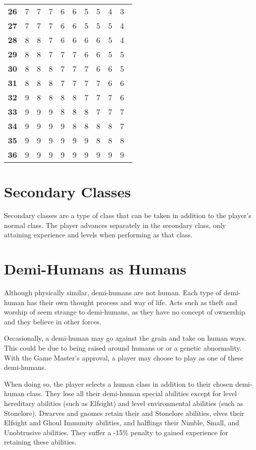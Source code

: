 \begin{multicols*}{2}
\begin {table}[H]
\begin{tabularx}{\columnwidth}{>{\bfseries}YYYYYYYYYY}
		26 & 7 & 7 & 7 & 6 & 6 & 5 & 5 & 4 & 3\\
		27 & 7 & 7 & 7 & 6 & 6 & 5 & 5 & 5 & 4\\
		28 & 8 & 8 & 7 & 6 & 6 & 6 & 6 & 5 & 4\\
		29 & 8 & 8 & 7 & 7 & 7 & 6 & 6 & 5 & 5\\
		30 & 8 & 8 & 8 & 7 & 7 & 7 & 6 & 6 & 5\\
		31 & 8 & 8 & 8 & 7 & 7 & 7 & 7 & 6 & 6\\
		32 & 9 & 8 & 8 & 8 & 8 & 7 & 7 & 7 & 6\\
		33 & 9 & 9 & 9 & 8 & 8 & 8 & 7 & 7 & 7\\
		34 & 9 & 9 & 9 & 9 & 8 & 8 & 8 & 8 & 7\\
		35 & 9 & 9 & 9 & 9 & 9 & 9 & 8 & 8 & 8\\
		36 & 9 & 9 & 9 & 9 & 9 & 9 & 9 & 9 & 9\
  \end {tabularx}
\end {table}

\section{Secondary Classes}\label{sec:Secondary Classes}
Secondary classes are a type of class that can be taken in addition to the player's normal class. The player advances separately in the secondary class, only attaining experience and levels when performing as that class.

\section{Demi-Humans as Humans}
Although physically similar, demi-humans are not human. Each type of demi-human has their own thought process and way of life. Acts such as theft and worship of  seem strange to demi-humans, as they have no concept of ownership and they believe in other forces.

Occasionally, a demi-human may go against the grain and take on human ways. This could be due to being raised around humans or or a genetic abnormality. With the Game Master's approval, a player may choose to play as one of these demi-humans.

When doing so, the player selects a human class in addition to their chosen demi-human class. They lose all their demi-human special abilities except for  level hereditary abilities (such as Elfsight) and  level environmental abilities (such as Stonelore). Dwarves and gnomes retain their  and Stonelore abilities, elves their Elfsight and Ghoul Immunity abilities, and halflings their Nimble, Small, and Unobtrusive abilities. They suffer a -15\% penalty to gained experience for retaining these abilities.


\end{multicols*}
